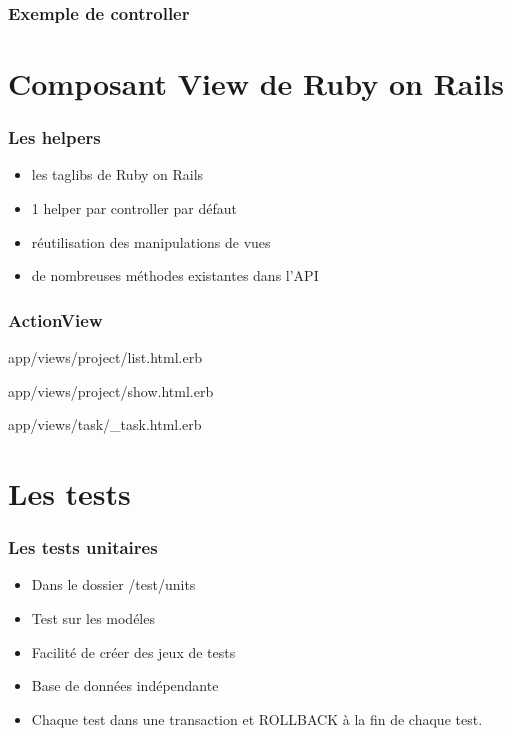 \documentclass{beamer}
\begin{document}
\begin{frame}
    \frametitle{Exemple de controller}
    
\end{frame}

\section{Composant View de Ruby on Rails}

\begin{frame}
    \frametitle{Les helpers}

    \begin{itemize}
        \item les taglibs de Ruby on Rails
        \item 1 helper par controller par défaut
        \item réutilisation des manipulations de vues
        \item de nombreuses méthodes existantes dans l'API
    \end{itemize}
\end{frame}

\begin{frame}
    \frametitle{ActionView}
    \begin{block}{app/views/project/list.html.erb}
        
    \end{block}
    \begin{block}{app/views/project/show.html.erb}
        
    \end{block}
    \begin{block}{app/views/task/\_task.html.erb}
        
    \end{block}
\end{frame}


\section{Les tests}

\begin{frame}
    \frametitle{Les tests unitaires}
    \begin{itemize}
        \item Dans le dossier /test/units
        \item Test sur les mod\'eles
        \item Facilité de créer des jeux de tests
        \item Base de données indépendante
        \item Chaque test dans une transaction et ROLLBACK \`a la fin de chaque
        test.
    \end{itemize}
\end{frame}
\end{document}
